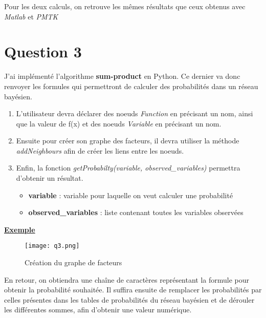 \documentclass[12pt]{article}
\begin{document}
Pour les deux calculs, on retrouve les mêmes résultats que ceux obtenus avec \textit{Matlab} et \textit{PMTK}

\section{Question 3}
J'ai implémenté l'algorithme \textbf{sum-product} en Python. Ce dernier va donc renvoyer les formules qui permettront de calculer des probabilités dans un réseau bayésien.
\begin{enumerate}
\item L'utilisateur devra déclarer des noeuds \textit{Function} en précisant un nom, ainsi que la valeur de f(x) et des noeuds \textit{Variable} en précisant un nom.

\item Ensuite pour créer son graphe des facteurs, il devra utiliser la méthode \textit{addNeighbours} afin de créer les liens entre les noeuds.

\item Enfin, la fonction \textit{getProbabilty(variable, observed\_variables)} permettra d'obtenir un résultat.
\begin{itemize}
\item \textbf{variable} : variable pour laquelle on veut calculer une probabilité 
\item \textbf{observed\_variables} : liste contenant toutes les variables observées
\\ \linebreak
\end{itemize}
\end{enumerate}

\textbf{\underline{Exemple}}
\begin{figure}[H]
\begin{center}
  \texttt{[image: q3.png]}
  \caption{Création du graphe de facteurs}
  \label{fig:Exemple}
\end{center}
\end{figure}

En retour, on obtiendra une chaîne de caractères représentant la formule pour obtenir la probabilité souhaitée. Il suffira ensuite de remplacer les probabilités par celles présentes dans les tables de probabilités du réseau bayésien et de dérouler les différentes sommes, afin d'obtenir une valeur numérique.
\end{document}

